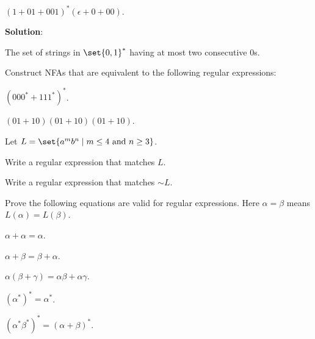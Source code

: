 \documentclass[11pt,fleqn]{article}
\begin{document}
    \item $(1 + 01 + 001)^*(\epsilon + 0 + 00)$.

\medskip

\textbf{Solution}:

\medskip

The set of strings in $\set{0,1}^*$ having at most two consecutive 0s.

  \ee

  \item Construct NFAs that are equivalent to the following regular
    expressions:

  \be

    \item $(000^* + 111^*)^*$.

    \item $(01 + 10)(01 + 10)(01 + 10)$.

  \ee
 
  \item Let $L = \set{a^mb^n \mid m \le 4 \text{ and } n \ge 3}$.

  \be

    \item Write a regular expression that matches $L$.

    \item Write a regular expression that matches ${\sim}L$.

  \ee

\newpage

  \item Prove the following equations are valid for regular
    expressions.  Here $\alpha = \beta$ means $L(\alpha) = L(\beta)$.

  \be

    \item $\alpha + \alpha = \alpha$.

    \item $\alpha + \beta = \beta + \alpha$.

    \item $\alpha(\beta + \gamma) = \alpha\beta + \alpha\gamma$.

    \item $(\alpha^*)^* = \alpha^*$.

    \item $(\alpha^*\beta^*)^* = (\alpha + \beta)^*$.

  \ee

\ee
\end{document}
